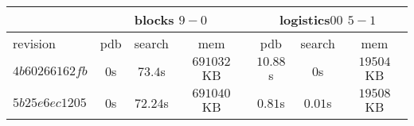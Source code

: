 \documentclass[a4paper,12pt]{scrartcl}
\begin{document}
\begin{tabular}{|l|c|c|c|c|c|c|}\hline
& \multicolumn{3}{c|}{blocks $9-0$} & \multicolumn{3}{c|}{logistics$00$ $5-1$}\\\hline
revision & pdb & search & mem & pdb & search & mem\\\hline
$4b60266162fb$ & $0$s & $73.4$s & $691032$ KB & $10.88$s & $0$s & $19504$ KB\\\hline
$5b25e6ec1205$ & $0$s & $72.24$s & $691040$ KB & $0.81$s & $0.01$s & $19508$ KB\\\hline
\end{tabular}
\end{document}
